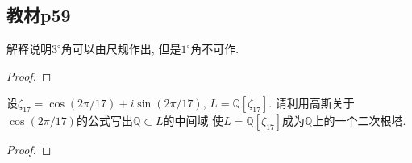 \subsection{教材p59}

\begin{problem}
    解释说明$3^\circ$角可以由尺规作出, 但是$1^\circ$角不可作.
\end{problem}

\begin{proof}
    
\end{proof}

\begin{problem}
    设$\zeta_{17} = \cos(2\pi/17) + i\sin(2\pi/17)$,
$L = \mathbb{Q}[\zeta_{17}]$. 请利用高斯关于
$\cos(2\pi/17)$的公式写出$\mathbb{Q} \subset L$的中间域
使$L = \mathbb{Q}[\zeta_{17}]$成为$\mathbb{Q}$上的一个二次根塔.
\end{problem}

\begin{proof}
    
\end{proof}